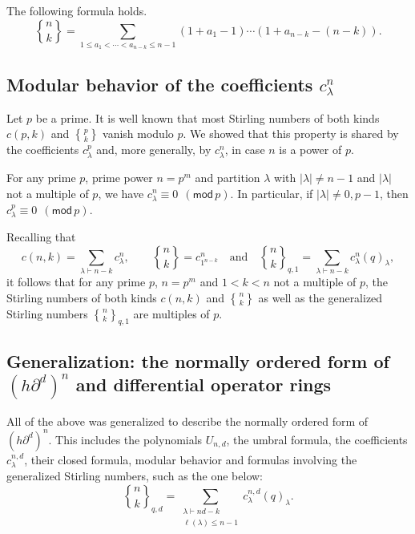 \documentclass{commat}
\newcommand\modd[1]{\ (\mathsf{mod} \, #1)}
\newcommand{\seq}[1]{\left( #1\right)}
\begin{document}
\begin{corollary} The following formula holds.
	\[ %
	\genfrac{\{}{\}}{0pt}{}{n}{k}=\sum_{1\leq a_1< \cdots <a_{n-k}\leq n-1} (1+a_1 -1)\cdots (1+a_{n-k} -(n-k)).\] 
\end{corollary}

\subsection{Modular behavior of the coefficients \texorpdfstring{$c_{\lambda}^n$}{cλn}}\label{S:comb:modp}

Let $p$ be a prime. It is well known that most Stirling numbers of both kinds $c(p,k)$ and %
$\genfrac{\{}{\}}{0pt}{}{p}{k}$ vanish modulo $p$. We showed that this property is shared by the coefficients $c^p_\lambda$ and, more generally, by $c^n_\lambda$, in case $n$ is a power of $p$.


\begin{theorem}\label{T:modp}
	For any prime $p$, prime power $n=p^m$ and partition $\lambda$ with $|\lambda|\neq n-1$ and $|\lambda|$ not a multiple of $p$, we have $c^n_\lambda \equiv 0\ \modd p$. In particular, if $|\lambda|\neq 0, p-1$, then $c^p_\lambda \equiv 0\ \modd p$.
\end{theorem}

Recalling that
\[
c(n,k)=\sum_{\lambda \vdash n-k} c_{\lambda}^n, \qquad  %
\genfrac{\{}{\}}{0pt}{}{n}{k}=c_{1^{n-k}}^n 
\quad \text{and}\quad
\genfrac{\{}{\}}{0pt}{}{n}{k}_{q,1}= \sum_{\lambda\vdash n-k} c_{\lambda}^{n}  (q)_{\lambda},
\]
it follows that for any prime $p$, $n=p^m$ and $1<k<n$ not a multiple of $p$, the Stirling numbers of both kinds 
$c(n,k)$ and %
$\genfrac{\{}{\}}{0pt}{}{n}{k}$ as well as the generalized Stirling numbers %
$\genfrac{\{}{\}}{0pt}{}{n}{k}_{q,1}$ are multiples of $p$.

\subsection{Generalization: the normally ordered form of \texorpdfstring{$\seq{h\partial^{d}}^n$}{(h∂d)n} and differential operator rings}\label{S:comb:gend}

All of the above was generalized to describe the normally ordered form of $\seq{h\partial^{d}}^n$. This includes the polynomials $U_{n,d}$, the umbral formula, the coefficients $c^{n, d}_\lambda$, their closed formula, modular behavior and formulas involving the generalized Stirling numbers, such as the one below:
\begin{equation*}%
	\genfrac{\{}{\}}{0pt}{}{n}{k}_{q,d}= \sum_{\substack{\lambda\vdash nd-k\\ \ell(\lambda)\leq n-1}} c_{\lambda}^{n,d} (q)_{\lambda}.
\end{equation*}
\end{document}
